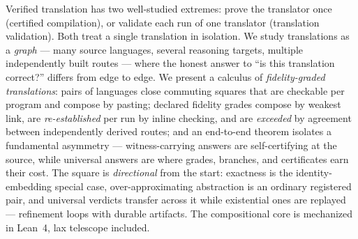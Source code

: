 Verified translation has two well-studied extremes: prove the translator
once (certified compilation), or validate each run of one translator
(translation validation). Both treat a single translation in isolation.
We study translations as a \emph{graph} --- many source languages,
several reasoning targets, multiple independently built routes --- where
the honest answer to ``is this translation correct?'' differs from edge
to edge. We present a calculus of \emph{fidelity-graded translations}:
pairs of languages close commuting squares that are checkable per
program and compose by pasting; declared fidelity grades compose by
weakest link, are \emph{re-established} per run by inline checking, and
are \emph{exceeded} by agreement between independently derived routes;
and an end-to-end theorem isolates a fundamental asymmetry ---
witness-carrying answers are self-certifying at the source, while
universal answers are where grades, branches, and certificates earn
their cost.\ifarxiv{} The square is \emph{directional} from the start:
exactness is the identity-embedding special case, over-approximating
abstraction is an ordinary registered pair, and universal verdicts
transfer across it while existential ones are replayed --- refinement
loops with durable artifacts.\fi{} The compositional core is mechanized
in Lean~4\ifarxiv{}, lax telescope included\fi{}.

